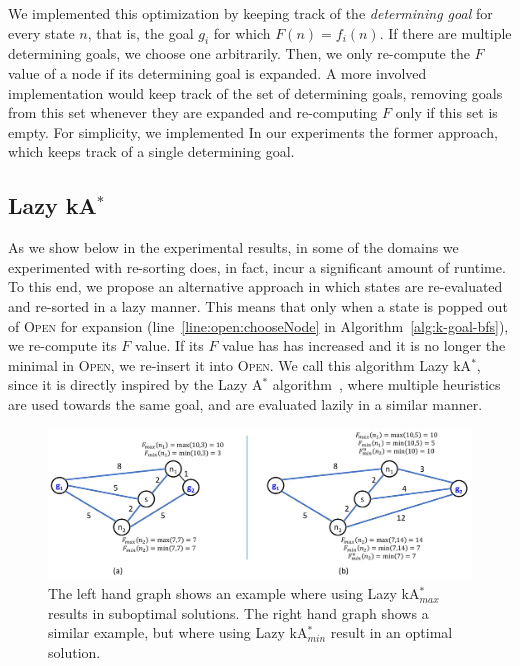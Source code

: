 \documentclass{aicom2e}
\newcommand{\astar}{A$^*$}
\newcommand{\kastar}{kA$^*$}
\newcommand{\kastarmin}{kA$^*_{min}$}
\newcommand{\kastarmax}{kA$^*_{max}$}
\newcommand{\open}{\textsc{Open}}
\begin{document}
We implemented this optimization by keeping track of the {\em determining goal} for every state $n$,
that is, the goal $g_i$ for which $F(n)=f_i(n)$. If there are multiple determining goals, we choose one arbitrarily. Then, we only re-compute the $F$ value of a node if its determining goal is expanded. A more involved implementation would keep track of the set of determining goals, removing goals from this set whenever they are expanded and re-computing $F$ only if this set is empty. For simplicity, we implemented In our experiments the former approach, which keeps track of a single determining goal.





\subsection{Lazy \kastar{}}

As we show below in the experimental results, in some of the domains we experimented with re-sorting does, in fact, incur a significant amount of runtime.
To this end, we propose an alternative approach
in which states are re-evaluated and re-sorted in a lazy manner. This means
that only when a state is popped out of \open{} for expansion
(line~\ref{line:open:chooseNode} in Algorithm~\ref{alg:k-goal-bfs}), we
re-compute its $F$ value. If its $F$ value has has increased and it is no
longer the minimal in \open, we re-insert it into \open{}. We call this
algorithm Lazy \kastar{}, since it is directly inspired by the Lazy \astar{}
algorithm~\cite{betzalel2015typeSystem,tolpin2013toward}, where multiple
heuristics are used towards the same goal, and are evaluated lazily in a
similar manner.


\begin{figure}
    \includegraphics[width=\textwidth]{Lazy_cropped.pdf}
    \caption{The left hand graph shows an example where using Lazy \kastarmax{}
results in suboptimal solutions. The right hand graph shows a similar example,
but where using Lazy \kastarmin{} result in an optimal solution.}
    \label{fig:lazy}
\end{figure}
\end{document}

